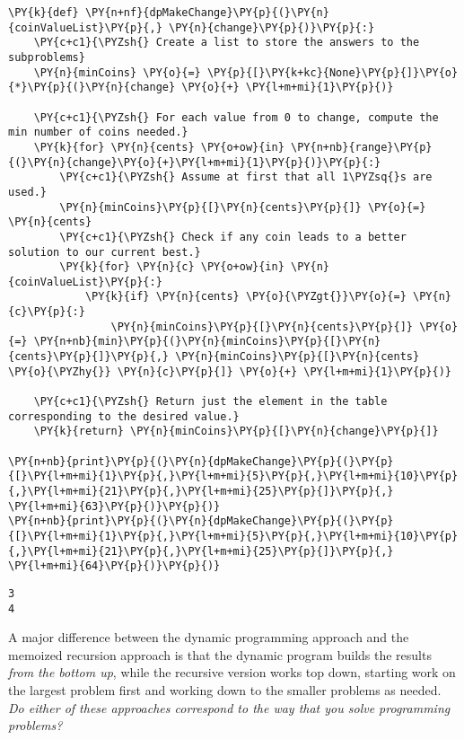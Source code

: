 \begin{Verbatim}[commandchars=\\\{\}]
\PY{k}{def} \PY{n+nf}{dpMakeChange}\PY{p}{(}\PY{n}{coinValueList}\PY{p}{,} \PY{n}{change}\PY{p}{)}\PY{p}{:}
    \PY{c+c1}{\PYZsh{} Create a list to store the answers to the subproblems}
    \PY{n}{minCoins} \PY{o}{=} \PY{p}{[}\PY{k+kc}{None}\PY{p}{]}\PY{o}{*}\PY{p}{(}\PY{n}{change} \PY{o}{+} \PY{l+m+mi}{1}\PY{p}{)}

    \PY{c+c1}{\PYZsh{} For each value from 0 to change, compute the min number of coins needed.}
    \PY{k}{for} \PY{n}{cents} \PY{o+ow}{in} \PY{n+nb}{range}\PY{p}{(}\PY{n}{change}\PY{o}{+}\PY{l+m+mi}{1}\PY{p}{)}\PY{p}{:}
        \PY{c+c1}{\PYZsh{} Assume at first that all 1\PYZsq{}s are used.}
        \PY{n}{minCoins}\PY{p}{[}\PY{n}{cents}\PY{p}{]} \PY{o}{=} \PY{n}{cents}
        \PY{c+c1}{\PYZsh{} Check if any coin leads to a better solution to our current best.}
        \PY{k}{for} \PY{n}{c} \PY{o+ow}{in} \PY{n}{coinValueList}\PY{p}{:}
            \PY{k}{if} \PY{n}{cents} \PY{o}{\PYZgt{}}\PY{o}{=} \PY{n}{c}\PY{p}{:}
                \PY{n}{minCoins}\PY{p}{[}\PY{n}{cents}\PY{p}{]} \PY{o}{=} \PY{n+nb}{min}\PY{p}{(}\PY{n}{minCoins}\PY{p}{[}\PY{n}{cents}\PY{p}{]}\PY{p}{,} \PY{n}{minCoins}\PY{p}{[}\PY{n}{cents} \PY{o}{\PYZhy{}} \PY{n}{c}\PY{p}{]} \PY{o}{+} \PY{l+m+mi}{1}\PY{p}{)}

    \PY{c+c1}{\PYZsh{} Return just the element in the table corresponding to the desired value.}
    \PY{k}{return} \PY{n}{minCoins}\PY{p}{[}\PY{n}{change}\PY{p}{]}

\PY{n+nb}{print}\PY{p}{(}\PY{n}{dpMakeChange}\PY{p}{(}\PY{p}{[}\PY{l+m+mi}{1}\PY{p}{,}\PY{l+m+mi}{5}\PY{p}{,}\PY{l+m+mi}{10}\PY{p}{,}\PY{l+m+mi}{21}\PY{p}{,}\PY{l+m+mi}{25}\PY{p}{]}\PY{p}{,} \PY{l+m+mi}{63}\PY{p}{)}\PY{p}{)}
\PY{n+nb}{print}\PY{p}{(}\PY{n}{dpMakeChange}\PY{p}{(}\PY{p}{[}\PY{l+m+mi}{1}\PY{p}{,}\PY{l+m+mi}{5}\PY{p}{,}\PY{l+m+mi}{10}\PY{p}{,}\PY{l+m+mi}{21}\PY{p}{,}\PY{l+m+mi}{25}\PY{p}{]}\PY{p}{,} \PY{l+m+mi}{64}\PY{p}{)}\PY{p}{)}
\end{Verbatim}

\begin{Verbatim}
3
4

\end{Verbatim}


A major difference between the dynamic programming approach and the memoized recursion approach is that the dynamic program builds the results \emph{from the bottom up}, while the recursive version works top down, starting work on the largest problem first and working down to the smaller problems as needed.
\emph{Do either of these approaches correspond to the way that you solve programming problems?}

